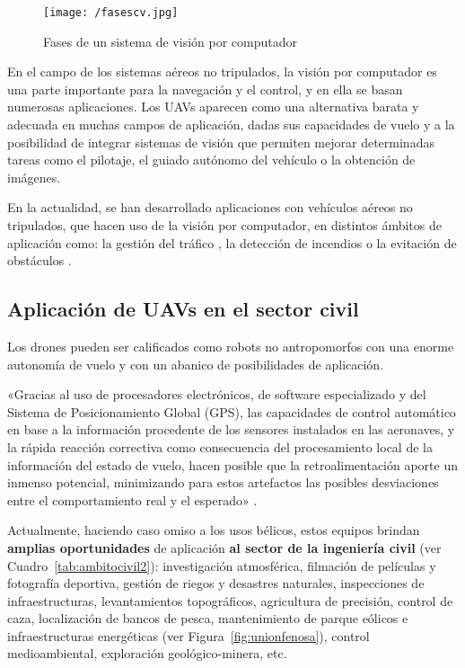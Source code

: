 \begin{figure}[!h]
\begin{center}
\texttt{[image: /fasescv.jpg]}
\caption[Fases de un sistema de visión por computador]{Fases de un sistema de visión por computador \cite{visionporcomputador}}
\label{fig:fasescv}
\end{center}
\end{figure}

En el campo de los sistemas aéreos no tripulados, la visión por computador es una parte importante para la navegación y el control, 
y en ella se basan numerosas aplicaciones. Los \acs{UAV}s aparecen como una alternativa barata y adecuada en muchas campos
de aplicación, dadas sus capacidades de vuelo y a la posibilidad de integrar sistemas de visión que permiten mejorar determinadas 
tareas como el pilotaje, el guiado autónomo del vehículo o la obtención de imágenes.

En la actualidad, se han desarrollado aplicaciones con vehículos aéreos no tripulados, que hacen uso de la visión por computador, en distintos ámbitos de aplicación como: la gestión del tráfico \cite{controltrafico}, la detección de incendios \cite{incendios} o la evitación de obstáculos \cite{obstaculos}.

\subsection{Aplicación de \acs{UAV}s en el sector civil}
\label{sec:ingenieriacivil}

Los drones pueden ser calificados como robots no antropomorfos con una enorme autonomía de vuelo y con un abanico de posibilidades de  aplicación.

«Gracias al uso de procesadores electrónicos, de software especializado y del Sistema de Posicionamiento Global (\acs{GPS}), las capacidades de control automático en base a la información procedente de los sensores instalados en las aeronaves, y la rápida reacción correctiva como consecuencia del procesamiento local de la información del estado de vuelo, hacen posible que la retroalimentación aporte un inmenso potencial,
minimizando para estos artefactos las posibles desviaciones entre el comportamiento real y el esperado» \cite{ambitocivil}.

Actualmente, haciendo caso omiso a los usos bélicos, estos equipos brindan \textbf{amplias oportunidades} de aplicación \textbf{al sector de la ingeniería civil} (ver Cuadro~\ref{tab:ambitocivil2}): investigación atmosférica, filmación de películas y fotografía deportiva, gestión de riegos y desastres naturales, inspecciones de infraestructuras, levantamientos topográficos, agricultura de precisión, control de caza, localización de bancos de pesca, mantenimiento de parque eólicos e infraestructuras energéticas (ver Figura~\ref{fig:unionfenosa}), control medioambiental, exploración geológico-minera, etc.

